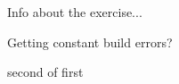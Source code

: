 \begin{intro}
Info about the exercise...
\end{intro}
\begin{problem}
Getting constant build errors?
\end{problem}
\begin{problem}
second of first
\end{problem}
